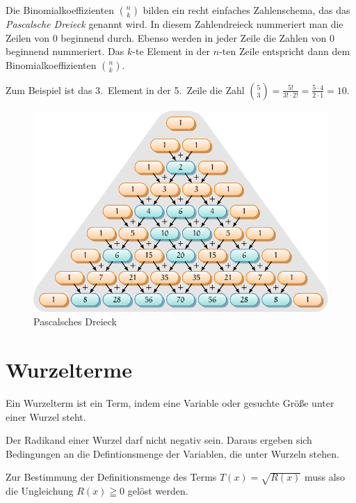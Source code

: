 \begin{beme}
Die Binomialkoeffizienten \(\binom{n}{k}\) bilden ein recht einfaches Zahlenschema, das das \emph{Pascalsche Dreieck} genannt wird. In diesem Zahlendreieck nummeriert man die Zeilen von 0 beginnend durch. Ebenso werden in jeder Zeile die Zahlen von 0 beginnend nummeriert. Das \(k\)-te Element in der \(n\)-ten Zeile entspricht dann dem Binomialkoeffizienten \(\binom{n}{k}\).

Zum Beispiel ist das 3.~Element in der 5.~Zeile die Zahl \(\binom{5}{3}=\frac{5!}{3!\cdot 2!} = \frac{5\cdot 4}{2\cdot 1} = 10\).

\begin{figure}\begin{center}
\includegraphics[width=\textwidth]{./pascal_triangle.pdf}
\end{center}
\caption{Pascalsches Dreieck}\end{figure}
\end{beme}


\section{Wurzelterme}

\begin{defi}[Wurzelterm]
 Ein Wurzelterm ist ein Term, indem eine Variable oder gesuchte Größe unter einer Wurzel steht.
\end{defi}

\begin{regel}
 Der Radikand einer Wurzel darf nicht negativ sein. Daraus ergeben sich Bedingungen an die Defintionsmenge der Variablen, die unter Wurzeln stehen.
 
 Zur Bestimmung der Definitionsmenge des Terms \(T(x)=\sqrt{R(x)}\) muss also die Ungleichung \(R(x)\geqq 0\) gelöst werden.
\end{regel}

